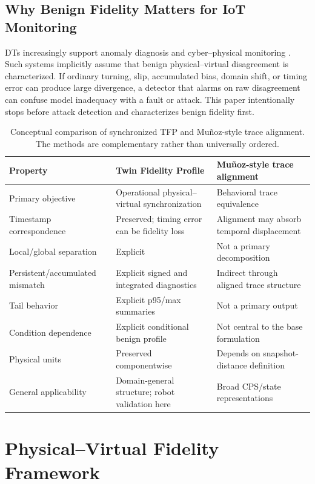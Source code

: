 \documentclass[journal]{IEEEtran}
\begin{document}
\subsection{Why Benign Fidelity Matters for IoT Monitoring}
DTs increasingly support anomaly diagnosis and cyber--physical monitoring \cite{ma2024,alcaraz2024,wu2023}. Such systems implicitly assume that benign physical--virtual disagreement is characterized. If ordinary turning, slip, accumulated bias, domain shift, or timing error can produce large divergence, a detector that alarms on raw disagreement can confuse model inadequacy with a fault or attack. This paper intentionally stops before attack detection and characterizes benign fidelity first.

\begin{table}[t]
\caption{Conceptual comparison of synchronized TFP and Mu\~noz-style trace alignment. The methods are complementary rather than universally ordered.}
\label{tab:tfpmunozconcept}
\centering
\footnotesize
\begin{tabular}{p{}p{}p{}}
\toprule
Property & Twin Fidelity Profile & Mu\~noz-style trace alignment \\
\midrule
Primary objective & Operational physical--virtual synchronization & Behavioral trace equivalence \\
Timestamp correspondence & Preserved; timing error can be fidelity loss & Alignment may absorb temporal displacement \\
Local/global separation & Explicit & Not a primary decomposition \\
Persistent/accumulated mismatch & Explicit signed and integrated diagnostics & Indirect through aligned trace structure \\
Tail behavior & Explicit p95/max summaries & Not a primary output \\
Condition dependence & Explicit conditional benign profile & Not central to the base formulation \\
Physical units & Preserved componentwise & Depends on snapshot-distance definition \\
General applicability & Domain-general structure; robot validation here & Broad CPS/state representations \\
\bottomrule
\end{tabular}
\end{table}

\section{Physical--Virtual Fidelity Framework}
\end{document}

